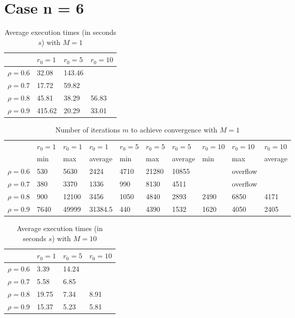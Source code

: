 \documentclass[a4paper,11pt,openright]{report}
\begin{document}
\section*{Case n = 6} 
\begin{table}[H]
\centering
\addtolength{\leftskip}{-1.5cm}
\addtolength{\rightskip}{-1.5cm}
\begin{tabular}{|c|lll|}
\hline
$ $ & $r_0 = 1$ & $r_0 = 5$ & $r_0 = 10$ \\
\hline
$\rho = 0.6$ & 32.08 & 143.46 &  \\

$\rho = 0.7$ & 17.72 & 59.82 &  \\

$\rho = 0.8$ & 45.81 & 38.29 & 56.83 \\

$\rho = 0.9$ & 415.62 & 20.29 & 33.01 \\
\hline
\end{tabular}
\caption{Average execution
 times (in seconds $s$) with $M = 1$}
\end{table}
\begin{table}[H]
\centering
\addtolength{\leftskip}{-1.5cm}
\addtolength{\rightskip}{-1.5cm}
\begin{tabular}{|c|lllllllll|}
\hline
$ $ & $r_0 = 1$ & $r_0 = 1$ & $r_0 = 1$ & $r_0 = 5$ & $r_0 = 5$ & $r_0 = 5$ & $r_0 = 10$ & $r_0 = 10$ & $r_0 = 10$  \\
$ $ & min & max & average & min & max & average & min & max & average \\ 
\hline
$\rho = 0.6$ & 530 & 5630 & 2424 & 4710 & 21280 & 10855 &  & overflow &  \\

$\rho = 0.7$ & 380 & 3370 & 1336 & 990 & 8130 & 4511 &  & overflow &  \\

$\rho = 0.8$ & 900 & 12100 & 3456 & 1050 & 4840 & 2893 & 2490 & 6850 & 4171 \\

$\rho = 0.9$ & 7640 & 49999 & 31384.5 & 440 & 4390 & 1532 & 1620 & 4050 & 2405\\
\hline
\end{tabular}
\caption{Number of iterations $m$ to achieve convergence with $M = 1$}
\end{table}
\begin{table}[H]
\centering
\addtolength{\leftskip}{-1.5cm}
\addtolength{\rightskip}{-1.5cm}
\begin{tabular}{|c|lll|}
\hline
$ $ & $r_0 = 1$ & $r_0 = 5$ & $r_0 = 10$ \\
\hline
$\rho = 0.6$ & 3.39 & 14.24 &  \\

$\rho = 0.7$ & 5.58 & 6.85 &  \\

$\rho = 0.8$ & 19.75 & 7.34 & 8.91 \\

$\rho = 0.9$ & 15.37 & 5.23 & 5.81 \\
\hline
\end{tabular}
\caption{Average execution
 times (in seconds $s$) with $M = 10$}
\end{table}
\end{document}
